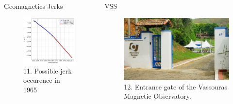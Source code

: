 \documentclass[final,t]{beamer}
\begin{document}
\begin{columns}[t]
\begin{column}{.25\linewidth}
\begin{block}{Geomagnetics Jerks}
		
		\begin{figure}
			\centering
			\includegraphics[scale=0.8]{"figs_ed/Linear regression Z_v3"}
			\caption{11. Possible jerk occurence in 1965}
			\label{fig:g_Sintetico}
		\end{figure}
		
		
	\end{block}
\end{column}



\begin{column}{.25\linewidth}



\begin{block}{VSS}
	\justifying
\begin{figure}
\centering
\includegraphics[width=0.9\linewidth]{OMV_JOELSONMOREIRA}
\caption{12. Entrance gate of the Vassouras Magnetic Observatory.}
\label{fig:OMV_JOELSONMOREIRA}
\end{figure}






\end{block}
\end{column}
\end{columns}
\end{document}
